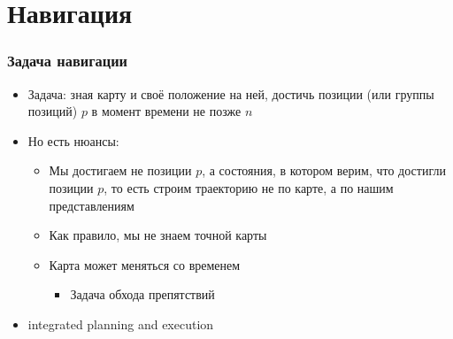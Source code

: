 \documentclass{../../slides-style}
\begin{document}
    \section{Навигация}

    \begin{frame}
        \frametitle{Задача навигации}
        \begin{itemize}
            \item Задача: зная карту и своё положение на ней, достичь позиции (или группы позиций) $p$ в момент времени не позже $n$
            \item Но есть нюансы:
            \begin{itemize}
                \item Мы достигаем не позиции $p$, а состояния, в котором верим, что достигли позиции $p$, то есть строим траекторию не по карте, а по нашим представлениям
                \item Как правило, мы не знаем точной карты
                \item Карта может меняться со временем
                \begin{itemize}
                    \item Задача обхода препятствий
                \end{itemize}
            \end{itemize}
            \item integrated planning and execution
        \end{itemize}
    \end{frame}
\end{document}
